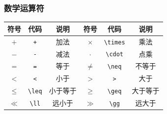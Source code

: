 \documentclass{article}
\begin{document}
\subsubsection{数学运算符}
\begin{center}
    \begin{tabular}{ccc|ccc}
        \hline
        \textbf{符号} & \textbf{代码} & \textbf{说明} & \textbf{符号} & \textbf{代码}   & \textbf{说明} \\
        \hline
        $+$         & \verb|+|    & 加法          & $\times$    & \verb|\times| & 乘法          \\
        $-$         & \verb|-|    & 减法          & $\cdot$     & \verb|\cdot|  & 点乘          \\
        $=$         & \verb|=|    & 等于          & $\neq$      & \verb|\neq|   & 不等于         \\
        $<$         & \verb|<|    & 小于          & $>$         & \verb|>|      & 大于          \\
        $\leq$      & \verb|\leq| & 小于等于        & $\geq$      & \verb|\geq|   & 大于等于        \\
        $\ll$       & \verb|\ll|  & 远小于         & $\gg$       & \verb|\gg|    & 远大于         \\
        \hline
    \end{tabular}
\end{center}
\end{document}
